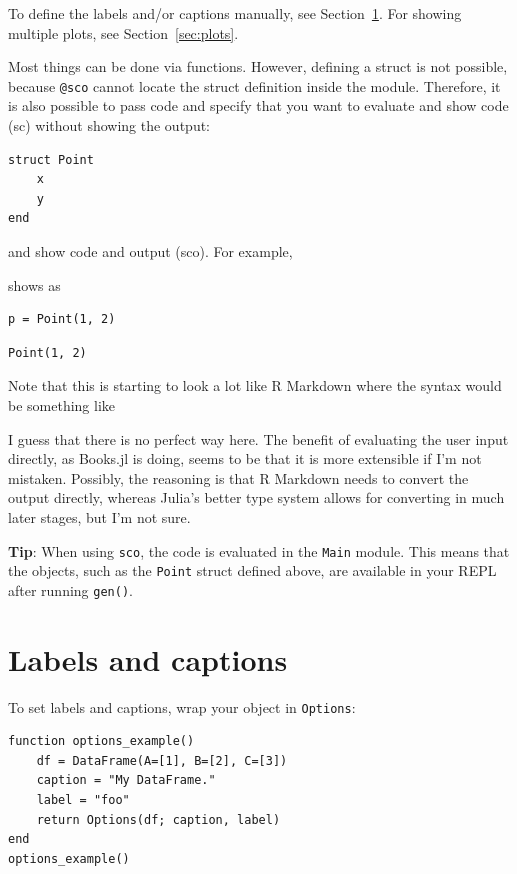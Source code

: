 \documentclass[
  14pt
  american,
  paper=a4,
  ,captions=tableheading
]{scrreprt}
\newcommand{\passthrough}[1]{#1}
\renewenvironment{quote}{\begin{customblockquote}\list{}{\rightmargin=0em\leftmargin=0em}%
\item\relax\color{blockquote-text}\ignorespaces}{\unskip\unskip\endlist\end{customblockquote}}
\begin{document}
To define the labels and/or captions manually, see
Section~\ref{sec:labels-captions}. For showing multiple plots, see
Section~\ref{sec:plots}.

Most things can be done via functions. However, defining a struct is not
possible, because \passthrough{\lstinline!@sco!} cannot locate the
struct definition inside the module. Therefore, it is also possible to
pass code and specify that you want to evaluate and show code (sc)
without showing the output:

\begin{lstlisting}
struct Point
    x
    y
end
\end{lstlisting}

and show code and output (sco). For example,

shows as

\begin{lstlisting}
p = Point(1, 2)
\end{lstlisting}

\begin{lstlisting}
Point(1, 2)
\end{lstlisting}

Note that this is starting to look a lot like R Markdown where the
syntax would be something like

I guess that there is no perfect way here. The benefit of evaluating the
user input directly, as Books.jl is doing, seems to be that it is more
extensible if I'm not mistaken. Possibly, the reasoning is that R
Markdown needs to convert the output directly, whereas Julia's better
type system allows for converting in much later stages, but I'm not
sure.

\begin{quote}
\textbf{Tip}: When using \passthrough{\lstinline!sco!}, the code is
evaluated in the \passthrough{\lstinline!Main!} module. This means that
the objects, such as the \passthrough{\lstinline!Point!} struct defined
above, are available in your REPL after running
\passthrough{\lstinline!gen()!}.
\end{quote}

\hypertarget{sec:labels-captions}{%
\section{Labels and captions}\label{sec:labels-captions}}

To set labels and captions, wrap your object in
\passthrough{\lstinline!Options!}:

\begin{lstlisting}
function options_example()
    df = DataFrame(A=[1], B=[2], C=[3])
    caption = "My DataFrame."
    label = "foo"
    return Options(df; caption, label)
end
options_example()
\end{lstlisting}
\end{document}
